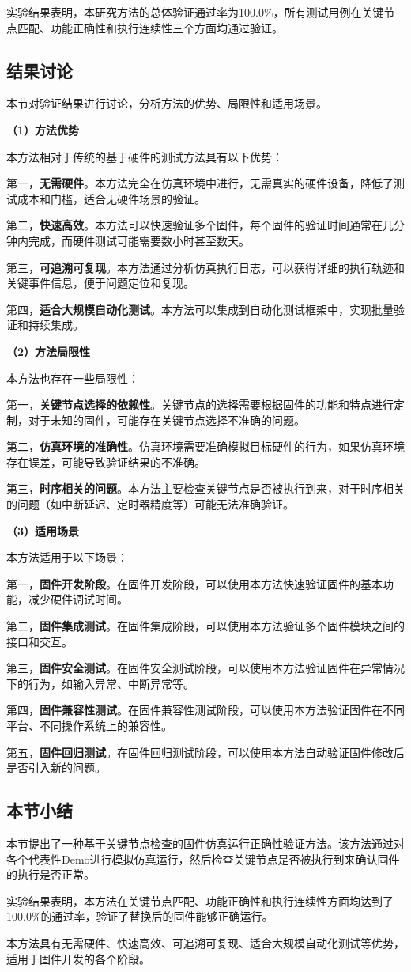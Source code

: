 实验结果表明，本研究方法的总体验证通过率为100.0\%，所有测试用例在关键节点匹配、功能正确性和执行连续性三个方面均通过验证。

\subsection{结果讨论}

本节对验证结果进行讨论，分析方法的优势、局限性和适用场景。

\textbf{（1）方法优势}

本方法相对于传统的基于硬件的测试方法具有以下优势：

第一，\textbf{无需硬件}。本方法完全在仿真环境中进行，无需真实的硬件设备，降低了测试成本和门槛，适合无硬件场景的验证。

第二，\textbf{快速高效}。本方法可以快速验证多个固件，每个固件的验证时间通常在几分钟内完成，而硬件测试可能需要数小时甚至数天。

第三，\textbf{可追溯可复现}。本方法通过分析仿真执行日志，可以获得详细的执行轨迹和关键事件信息，便于问题定位和复现。

第四，\textbf{适合大规模自动化测试}。本方法可以集成到自动化测试框架中，实现批量验证和持续集成。

\textbf{（2）方法局限性}

本方法也存在一些局限性：

第一，\textbf{关键节点选择的依赖性}。关键节点的选择需要根据固件的功能和特点进行定制，对于未知的固件，可能存在关键节点选择不准确的问题。

第二，\textbf{仿真环境的准确性}。仿真环境需要准确模拟目标硬件的行为，如果仿真环境存在误差，可能导致验证结果的不准确。

第三，\textbf{时序相关的问题}。本方法主要检查关键节点是否被执行到来，对于时序相关的问题（如中断延迟、定时器精度等）可能无法准确验证。

\textbf{（3）适用场景}

本方法适用于以下场景：

第一，\textbf{固件开发阶段}。在固件开发阶段，可以使用本方法快速验证固件的基本功能，减少硬件调试时间。

第二，\textbf{固件集成测试}。在固件集成阶段，可以使用本方法验证多个固件模块之间的接口和交互。

第三，\textbf{固件安全测试}。在固件安全测试阶段，可以使用本方法验证固件在异常情况下的行为，如输入异常、中断异常等。

第四，\textbf{固件兼容性测试}。在固件兼容性测试阶段，可以使用本方法验证固件在不同平台、不同操作系统上的兼容性。

第五，\textbf{固件回归测试}。在固件回归测试阶段，可以使用本方法自动验证固件修改后是否引入新的问题。

\subsection{本节小结}

本节提出了一种基于关键节点检查的固件仿真运行正确性验证方法。该方法通过对各个代表性Demo进行模拟仿真运行，然后检查关键节点是否被执行到来确认固件的执行是否正常。

实验结果表明，本方法在关键节点匹配、功能正确性和执行连续性方面均达到了100.0\%的通过率，验证了替换后的固件能够正确运行。

本方法具有无需硬件、快速高效、可追溯可复现、适合大规模自动化测试等优势，适用于固件开发的各个阶段。
